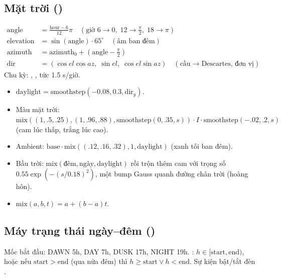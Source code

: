 \subsection{Mặt trời ()}
\begin{align*}
\mathrm{angle}&=\tfrac{\mathrm{hour}-6}{12}\pi\quad(\text{giờ }6\to0,\;12\to\tfrac\pi2,\;18\to\pi)\\
\mathrm{elevation}&=\sin(\mathrm{angle})\cdot65^\circ\quad(\text{âm ban đêm})\\
\mathrm{azimuth}&=\mathrm{azimuth}_0+(\mathrm{angle}-\tfrac\pi2)\\
\mathrm{dir}&=(\cos el\cos az,\;\sin el,\;\cos el\sin az)\quad(\text{cầu}\to\text{Descartes, đơn vị})
\end{align*}
Chu kỳ: , , tức 1.5 s/giờ.
\begin{itemize}
\item $\mathrm{daylight}=\mathrm{smoothstep}(-0.08,0.3,\mathrm{dir}_y)$.
\item Màu mặt trời: $\mathrm{mix}((1,.5,.25),(1,.96,.88),\mathrm{smoothstep}(0,.35,s))\cdot I\cdot\mathrm{smoothstep}(-.02,.2,s)$ (cam lúc thấp, trắng lúc cao).
\item Ambient: $\mathrm{base}\cdot\mathrm{mix}((.12,.16,.32),1,\mathrm{daylight})$ (xanh tối ban đêm).
\item Bầu trời: $\mathrm{mix}(\text{đêm},\text{ngày},\mathrm{daylight})$ rồi trộn thêm cam với trọng số $0.55\exp(-(s/0.18)^2)$, một bump Gauss quanh đường chân trời (hoàng hôn).
\item $\mathrm{mix}(a,b,t)=a+(b-a)t$.
\end{itemize}

\subsection{Máy trạng thái ngày--đêm ()}
Mốc bắt đầu: DAWN 5h, DAY 7h, DUSK 17h, NIGHT 19h. : $h\in[\mathrm{start},\mathrm{end})$, hoặc nếu $\mathrm{start}>\mathrm{end}$ (qua nửa đêm) thì $h\ge\mathrm{start}\lor h<\mathrm{end}$. Sự kiện  bật/tắt đèn .

